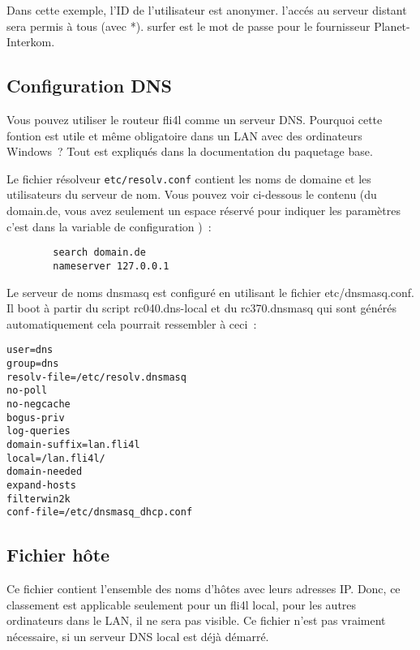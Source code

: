 Dans cette exemple, l'ID de l'utilisateur est \og{}anonymer\fg{}. l'accés au serveur
distant sera permis à tous (avec \og{}*\fg{}). \og{}surfer\fg{} est le mot de passe
pour le fournisseur Planet-Interkom.


\subsection{Configuration DNS}

Vous pouvez utiliser le routeur fli4l comme un serveur DNS.
Pourquoi cette fontion est utile et même obligatoire dans un LAN avec des ordinateurs
Windows~? Tout est expliqués dans la documentation du paquetage \og{}base\fg{}.

Le fichier résolveur \texttt{etc/resolv.conf} contient les noms de domaine et
les utilisateurs du serveur de nom. Vous pouvez voir ci-dessous le contenu
(du \og{}domain.de\fg{}, vous avez seulement un espace réservé pour indiquer les
paramètres c'est dans la variable de configuration )~:

\begin{example}
\begin{verbatim}
        search domain.de
        nameserver 127.0.0.1
\end{verbatim}
\end{example}

Le serveur de noms dnsmasq est configuré en utilisant le fichier etc/dnsmasq.conf.
Il boot à partir du script rc040.dns-local et du rc370.dnsmasq qui sont générés
automatiquement cela pourrait ressembler à ceci~:

\begin{example}
\begin{verbatim}
user=dns
group=dns
resolv-file=/etc/resolv.dnsmasq
no-poll
no-negcache
bogus-priv
log-queries
domain-suffix=lan.fli4l
local=/lan.fli4l/
domain-needed
expand-hosts
filterwin2k
conf-file=/etc/dnsmasq_dhcp.conf
\end{verbatim}
\end{example}


\subsection{Fichier hôte}

    Ce fichier contient l'ensemble des noms d'hôtes avec leurs adresses IP.
	Donc, ce classement est applicable seulement pour un fli4l local, pour les autres
	ordinateurs dans le LAN, il ne sera pas visible. Ce fichier n'est pas vraiment
	nécessaire, si un serveur DNS local est déjà démarré.


